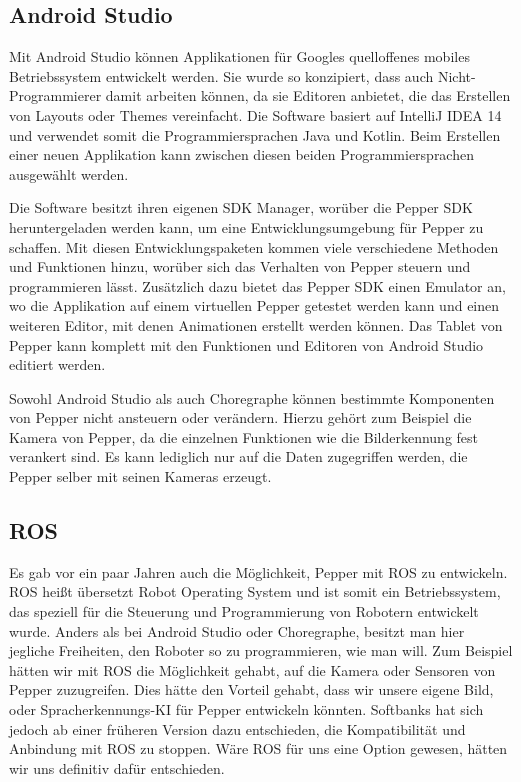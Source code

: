 \subsection{Android Studio}

Mit Android Studio können Applikationen für Googles quelloffenes mobiles Betriebssystem entwickelt werden. Sie wurde so konzipiert, dass 
auch Nicht-Programmierer damit arbeiten können, da sie Editoren anbietet, die das Erstellen von Layouts oder Themes vereinfacht. 
Die Software basiert auf IntelliJ IDEA 14 und verwendet somit die Programmiersprachen Java und Kotlin. Beim Erstellen einer neuen 
Applikation kann zwischen diesen beiden Programmiersprachen ausgewählt werden.

Die Software besitzt ihren eigenen SDK Manager, worüber die Pepper SDK heruntergeladen werden kann, um eine Entwicklungsumgebung für Pepper 
zu schaffen. Mit diesen Entwicklungspaketen kommen viele verschiedene Methoden und Funktionen hinzu, worüber sich das Verhalten von Pepper 
steuern und programmieren lässt. Zusätzlich dazu bietet das Pepper SDK einen Emulator an, wo die Applikation auf einem virtuellen Pepper 
getestet werden kann und einen weiteren Editor, mit denen Animationen erstellt werden können. Das Tablet von Pepper kann komplett mit den 
Funktionen und Editoren von Android Studio editiert werden. 

Sowohl Android Studio als auch Choregraphe können bestimmte Komponenten von Pepper nicht ansteuern oder verändern. Hierzu gehört zum 
Beispiel die Kamera von Pepper, da die einzelnen Funktionen wie die Bilderkennung fest verankert sind. Es kann lediglich nur auf die Daten 
zugegriffen werden, die Pepper selber mit seinen Kameras erzeugt.
\cite{Android_Studio}

\subsection{ROS}

Es gab vor ein paar Jahren auch die Möglichkeit, Pepper mit ROS zu entwickeln. 
ROS heißt übersetzt \glqq Robot Operating System \glqq{} und ist somit ein Betriebssystem, das speziell für die Steuerung und Programmierung 
von Robotern entwickelt wurde. Anders als bei Android Studio oder Choregraphe, besitzt man hier jegliche Freiheiten, den Roboter so zu 
programmieren, wie man will. Zum Beispiel hätten wir mit ROS die Möglichkeit gehabt, auf die Kamera oder Sensoren von Pepper zuzugreifen. 
Dies hätte den Vorteil gehabt, dass wir unsere eigene Bild, oder Spracherkennungs-KI für Pepper entwickeln könnten. Softbanks hat sich 
jedoch ab einer früheren Version dazu entschieden, die Kompatibilität und Anbindung mit ROS zu stoppen. Wäre ROS für uns eine Option 
gewesen, hätten wir uns definitiv dafür entschieden. 

